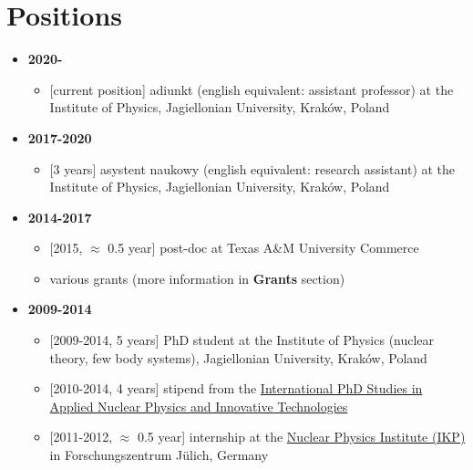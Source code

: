 \hypertarget{positions}{%
\section{Positions}\label{positions}}

\begin{itemize}
\tightlist
\item
  \textbf{2020-}

  \begin{itemize}
  \tightlist
  \item
    {[}current position{]} adiunkt (english equivalent: assistant
    professor) at the Institute of Physics, Jagiellonian University,
    Kraków, Poland
  \end{itemize}
\item
  \textbf{2017-2020}

  \begin{itemize}
  \tightlist
  \item
    {[}3 years{]} asystent naukowy (english equivalent: research
    assistant) at the Institute of Physics, Jagiellonian University,
    Kraków, Poland
  \end{itemize}
\item
  \textbf{2014-2017}

  \begin{itemize}
  \tightlist
  \item
    {[}2015, \(\approx\) 0.5 year{]} post-doc at Texas A\&M University
    Commerce
  \item
    various grants (more information in \textbf{Grants} section)
  \end{itemize}
\item
  \textbf{2009-2014}

  \begin{itemize}
  \tightlist
  \item
    {[}2009-2014, 5 years{]} PhD student at the Institute of Physics
    (nuclear theory, few body systems), Jagiellonian University, Kraków,
    Poland
  \item
    {[}2010-2014, 4 years{]} stipend from the
    \href{https://fais.uj.edu.pl/applied-nuclear-physics-and-innovative-technologies}{International
    PhD Studies in Applied Nuclear Physics and Innovative Technologies}
  \item
    {[}2011-2012, \(\approx\) 0.5 year{]} internship at the
    \href{https://www.fz-juelich.de/ikp/EN/Home/home_node.html}{Nuclear
    Physics Institute (IKP)} in Forschungszentrum Jülich, Germany
  \end{itemize}
\end{itemize}

